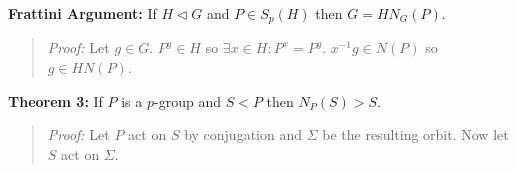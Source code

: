 {\bf Frattini Argument:} If $H \lhd G$ and $P \in S_p(H)$ then $G= H N_G(P)$.
\begin{quote}
\emph{Proof:}  Let $g \in G$.  $P^g \in H$ so $\exists x \in H: P^x=P^g$.  $x^{-1}g \in N(P)$ so
$g \in HN(P)$.
\end{quote}
{\bf Theorem 3:} If $P$ is a $p$-group and $S < P$ then $N_P(S) > S$.
\begin{quote}
\emph{Proof:}  Let $P$ act on $S$ by conjugation and $\Sigma$ be the resulting orbit.
Now let $S$ act on $\Sigma$.
\end{quote}


